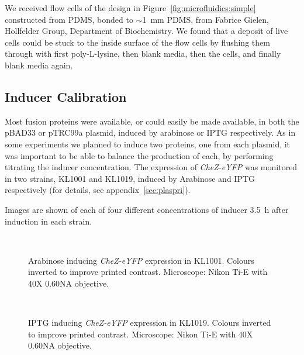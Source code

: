\documentclass[../main.tex]{subfiles}
\begin{document}
We received flow cells of the design in Figure~\ref{fig:microfluidics:simple} constructed from PDMS, bonded to \(\sim\)\SI{1}{\milli\meter} PDMS, from Fabrice Gielen, Hollfelder Group, Department of Biochemistry. We found that a deposit of live cells could be stuck to the inside surface of the flow cells by flushing them through with first poly-L-lysine, then blank media, then the cells, and finally blank media again.

\subsection{Inducer Calibration}

Most fusion proteins were available, or could easily be made available, in both the pBAD33 or pTRC99a plasmid, induced by arabinose or IPTG respectively. As in some experiments we planned to induce two proteins, one from each plasmid, it was important to be able to balance the production of each, by performing titrating the inducer concentration. The expression of \textsl{CheZ-eYFP} was monitored in two strains, KL1001 and KL1019, induced by Arabinose and IPTG respectively (for details, see appendix~\ref{sec:plaspri}).

Images are shown of each of four different concentrations of inducer \SI{3.5}{\hour} after induction in each strain.

\begin{figure}
\begin{center}
\\
\caption[Arabinose inducer titration]{Arabinose inducing \textsl{CheZ-eYFP} expression in KL1001. Colours inverted to improve printed contrast. Microscope: Nikon Ti-E with 40X 0.60NA objective.}
\end{center}
\end{figure}

\begin{figure}
\begin{center}
\\
\caption[IPTG inducer titration]{IPTG inducing \textsl{CheZ-eYFP} expression in KL1019. Colours inverted to improve printed contrast. Microscope: Nikon Ti-E with 40X 0.60NA objective.}
\end{center}
\end{figure}
\end{document}
